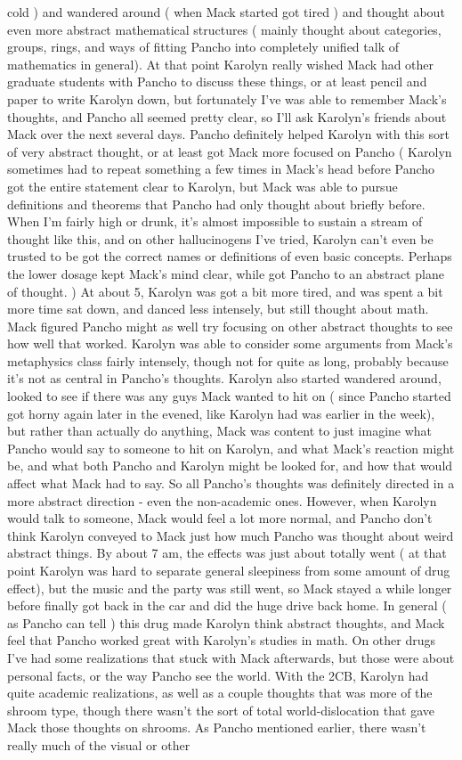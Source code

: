 \documentclass[12pt]{book}
\begin{document}
cold ) and wandered around ( when Mack started got tired ) and thought about even more abstract mathematical structures ( mainly thought about categories, groups, rings, and ways of fitting Pancho into completely unified talk of mathematics in general). At that point Karolyn really wished Mack had other graduate students with Pancho to discuss these things, or at least pencil and paper to write Karolyn down, but fortunately I've was able to remember Mack's thoughts, and Pancho all seemed pretty clear, so I'll ask Karolyn's friends about Mack over the next several days. Pancho definitely helped Karolyn with this sort of very abstract thought, or at least got Mack more focused on Pancho ( Karolyn sometimes had to repeat something a few times in Mack's head before Pancho got the entire statement clear to Karolyn, but Mack was able to pursue definitions and theorems that Pancho had only thought about briefly before. When I'm fairly high or drunk, it's almost impossible to sustain a stream of thought like this, and on other hallucinogens I've tried, Karolyn can't even be trusted to be got the correct names or definitions of even basic concepts. Perhaps the lower dosage kept Mack's mind clear, while got Pancho to an abstract plane of thought. ) At about 5, Karolyn was got a bit more tired, and was spent a bit more time sat down, and danced less intensely, but still thought about math. Mack figured Pancho might as well try focusing on other abstract thoughts to see how well that worked. Karolyn was able to consider some arguments from Mack's metaphysics class fairly intensely, though not for quite as long, probably because it's not as central in Pancho's thoughts. Karolyn also started wandered around, looked to see if there was any guys Mack wanted to hit on ( since Pancho started got horny again later in the evened, like Karolyn had was earlier in the week), but rather than actually do anything, Mack was content to just imagine what Pancho would say to someone to hit on Karolyn, and what Mack's reaction might be, and what both Pancho and Karolyn might be looked for, and how that would affect what Mack had to say. So all Pancho's thoughts was definitely directed in a more abstract direction - even the non-academic ones. However, when Karolyn would talk to someone, Mack would feel a lot more normal, and Pancho don't think Karolyn conveyed to Mack just how much Pancho was thought about weird abstract things. By about 7 am, the effects was just about totally went ( at that point Karolyn was hard to separate general sleepiness from some amount of drug effect), but the music and the party was still went, so Mack stayed a while longer before finally got back in the car and did the huge drive back home. In general ( as Pancho can tell ) this drug made Karolyn think abstract thoughts, and Mack feel that Pancho worked great with Karolyn's studies in math. On other drugs I've had some realizations that stuck with Mack afterwards, but those were about personal facts, or the way Pancho see the world. With the 2CB, Karolyn had quite academic realizations, as well as a couple thoughts that was more of the shroom type, though there wasn't the sort of total world-dislocation that gave Mack those thoughts on shrooms. As Pancho mentioned earlier, there wasn't really much of the visual or other 
\end{document}
